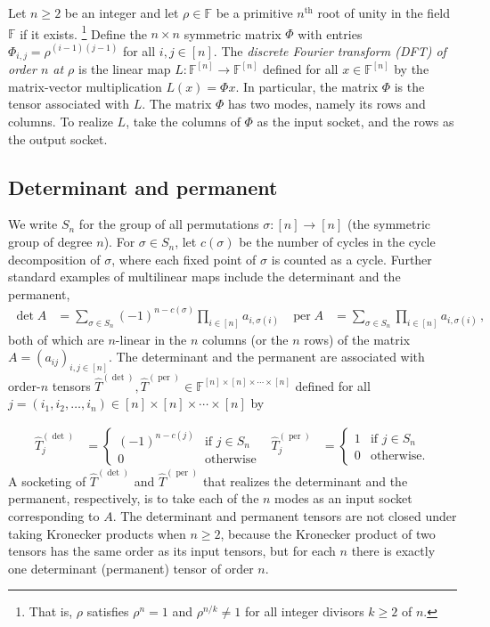 \documentclass{toc}
\newcommand{\per}{\ensuremath{\operatorname{per}}}
\newcommand{\F}{\ensuremath{\mathbb{F}}}
\begin{document}
Let $n\geq 2$ be an integer and let $\rho\in\F$ be a primitive
$n^\text{th}$ root of unity in the field $\F$ if it exists.%
\footnote{That is, $\rho$ satisfies $\rho^n=1$ and $\rho^{n/k}\neq 1$
for all integer divisors $k\geq 2$ of $n$.}{}
Define the $n\times n$ symmetric matrix $\Phi$ with
entries $\Phi_{i,j}=\rho^{(i-1)(j-1)}$ for all $i,j\in [n]$.
The \emph{discrete Fourier transform (DFT) of order $n$ at $\rho$} is the
linear map $L:\F^{[n]}\rightarrow \F^{[n]}$ defined for all $x\in\F^{[n]}$
by the matrix-vector multiplication $L(x)=\Phi x$.
In particular, the matrix $\Phi$ is the tensor
associated with $L$. The matrix $\Phi$ has two modes,
namely its rows and columns.
To realize $L$, take the columns of $\Phi$ as the input socket, and the rows
as the output socket.

\subsection{Determinant and permanent}

%
%
We   %
write $S_n$ for the %
%
group of all permutations
$\sigma:[n]\rightarrow [n]$
(the symmetric group of degree $n$).  %
For $\sigma \in S_n$, let $c(\sigma)$ be the number of
cycles in the cycle decomposition of $\sigma$,
where each fixed point of $\sigma$ is counted as a cycle.
Further standard examples of multilinear %
%
%
maps
%
include the determinant and
the  %
permanent,  %
\begin{align}
\label{eq:det and per}
\det A &=
\sum_{\sigma\in S_n}(-1)^{n-c(\sigma)}\prod_{i\in[n]}a_{i,\sigma(i)} &
\per A &=
\sum_{\sigma\in S_n}\prod_{i\in[n]}a_{i,\sigma(i)}\,,
\end{align}
both of which are $n$-linear in the $n$ columns (or the $n$ rows) of the
matrix $A=(a_{ij})_{i,j\in[n]}$.
The determinant and 
the  %
permanent are associated with order-$n$  %
tensors
$\hat{T}^{(\det)}, \hat{T}^{(\per)} \in \F^{[n] \times [n] \times \cdots \times [n]}$
defined for all $j = (i_1,i_2,\ldots,i_n) \in [n] \times [n] \times \cdots \times [n]$ by

\begin{align}
\label{tensor:det}
\hat{T}^{(\det)}_{j}&=
\begin{cases}
(-1)^{n-c(j)} & \text{if } j \in S_n\\
0 & \text{otherwise}
\end{cases} &
\hat{T}^{(\per)}_{j}&=
\begin{cases}
1 & \text{if } j \in S_n\\
0 & \text{otherwise}.
\end{cases}
\end{align}
A socketing of $\hat{T}^{(\det)}$ and $\hat{T}^{(\per)}$ that realizes the determinant and
the  %
permanent, respectively, is to take each of the $n$ modes as an input socket corresponding to $A$.
%
The determinant and permanent tensors are not closed under taking Kronecker products when $n \geq 2$, because the Kronecker product of two tensors has the same order as its input tensors, 
%
%
%
but for each $n$ there is exactly one determinant (permanent) tensor of order $n$.
\end{document}
